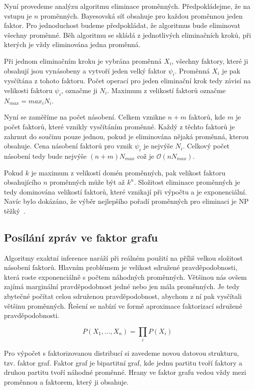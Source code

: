 Nyní provedeme analýzu algoritmu eliminace proměnných.
Předpokládejme, že na vstupu je $n$ proměnných.
Bayesovská síť obsahuje pro každou proměnnou jeden faktor.
Pro jednoduchost budeme předpokládat, že algoritmus bude eliminovat všechny proměnné.
Běh algoritmu se skládá z jednotlivých eliminačních kroků, při kterých je vždy eliminována jedna proměnná.

Při jednom eliminačním kroku je vybrána proměnná $X_i$, všechny faktory, které ji obsahují jsou vynásobeny a vytvoří jeden velký faktor $\psi_i$.
Proměnná $X_i$ je pak vysčítána z tohoto faktoru.
Počet operací pro jeden eliminační krok tedy závisí na velikosti faktoru $\psi_i$, označme ji $N_i$.
Maximum z velikostí faktorů označme $N_{max} = max_i N_i$.

Nyní se zaměříme na počet násobení.
Celkem vznikne $n+m$ faktorů, kde $m$ je počet faktorů, které vznikly vysčítáním proměnné.
Každý z těchto faktorů je zahrnut do součinu pouze jednou, pokud je eliminována nějaká proměnná, kterou obsahuje.
Cena násobení faktorů pro vznik $\psi_i$ je nejvýše $N_i$.
Celkový počet násobení tedy bude nejvýše $(n+m)N_{max}$ což je $\mathcal{O}(nN_{max})$.

Pokud $k$ je maximum z velikostí domén proměnných, pak velikost faktoru obsahujícího $n$ proměnných může být až $k^n$.
Složitost eliminace proměnných je tedy dominována velikostí faktorů, které vznikají při výpočtu a je exponenciální.
Navíc bylo dokázáno, že výběr nejlepšího pořadí proměnných pro eliminaci je NP těžký~\cite{arnborg1987complexity}.

\subsection{Posílání zpráv ve faktor grafu}

Algoritmy exaktní inference naráží při reálném použití na příliš velkou složitost násobení faktorů.
Hlavním problémem je velikost sdružené pravděpodobnosti, která roste exponenciálně s počtem náhodných proměnných.
Většinou nás ovšem zajímá marginální pravděpodobnost jedné nebo jen mála proměnných.
Je tedy zbytečné počítat celou sdruženou pravděpodobnost, abychom z ní pak vysčítali většinu proměnných.
Řešení se nabízí ve formě aproximace faktorizací sdružené pravděpodobnosti.

\begin{equation*}
    P(X_1, \dots, X_n) = \prod_i P(X_i)
\end{equation*}

Pro výpočet s faktorizovanou distribucí si zavedeme novou datovou strukturu, tzv. faktor graf.
Faktor graf je bipartitní graf, kde jednu partitu tvoří faktory a druhou partitu tvoří náhodné proměnné.
Hrany ve faktor grafu vedou vždy mezi proměnnou a faktorem, který ji obsahuje.

